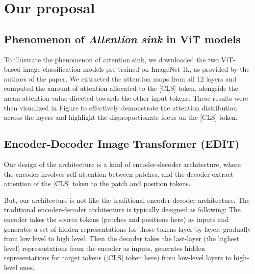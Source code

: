 \documentclass[anon,12pt]{colt2024} %
\begin{document}
\section{Our proposal}

\subsection{Phenomenon of \textit{Attention sink} in ViT models}

To illustrate the phenomenon of attention sink, we downloaded the two ViT-based image classification models \cite{touvron2021training} pre-trained on ImageNet-1k, as provided by the authors of the paper. We extracted the attention maps from all 12 layers and computed the amount of attention allocated to the [CLS] token, alongside the mean attention value directed towards the other input tokens. 
These results were then visualized in Figure to effectively demonstrate the attention distribution across the layers and highlight the disproportionate focus on the [CLS] token.



\subsection{Encoder-Decoder Image Transformer (EDIT)}

Our design of the architecture is a kind of encoder-decoder architecture, where the encoder involves self-attention between patches, and the decoder extract attention of the [CLS] token to the patch and position tokens.

But, our architecture is not like the traditional encoder-decoder architecture.
The traditional encoder-decoder architecture is typically designed as following:
The encoder takes the source tokens (patches and positions here) as inputs and generates a set of hidden representations for those tokens layer by layer, gradually from low level to high level. Then the decoder takes the last-layer (the highest level) representations from the encoder as inputs, generates hidden representations for target tokens ([CLS] token here) from low-level layers to high-level ones.

\end{document}
